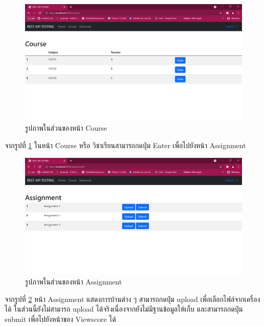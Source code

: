 \begin{figure}[!thb]
	\captionsetup{justification=centering}
	\centering
	\includegraphics[width=5in]{figures/course.png}
	\caption{รูปภาพในส่วนของหน้า Course}
	\label{fig:coure}
\end{figure}
\noindent จากรูปที่ \ref{fig:coure} ในหน้า Course หรือ
วิชาเรียนสามารถกดปุ่ม Enter เพื่อไปยังหน้า Assignment

\begin{figure}[!thb]
	\captionsetup{justification=centering}
	\centering
	\includegraphics[width=5in]{figures/assign.png}
	\caption{รูปภาพในส่วนของหน้า Assignment}
	\label{fig:assign}
\end{figure}
\noindent จากรูปที่ \ref{fig:assign} หน้า Assignment แสดงการบ้านต่าง ๆ สามารถกดปุ่ม upload เพื่อเลือกไฟล์จากเครื่องได้ ในส่วนนี้ยังไม่สามารถ upload ได้จริงเนื่องจากยังไม่มีฐานข้อมูลให้เก็บ และสามารถกดปุ่ม submit เพื่อไปยังหน้าของ Viewscore ได้
\newpage

